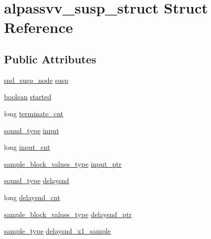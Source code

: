 \hypertarget{structalpassvv__susp__struct}{}\section{alpassvv\+\_\+susp\+\_\+struct Struct Reference}
\label{structalpassvv__susp__struct}
\subsection*{Public Attributes}
\begin{DoxyCompactItemize}
\item 
\hyperlink{sound_8h_a6b268203688a934bd798ceb55f85d4c0}{snd\+\_\+susp\+\_\+node} \hyperlink{structalpassvv__susp__struct_a9f18281901c2261d76bb10a85736bce1}{susp}
\item 
\hyperlink{cext_8h_a7670a4e8a07d9ebb00411948b0bbf86d}{boolean} \hyperlink{structalpassvv__susp__struct_a42d25934c0b3fc6941bc10245a004f41}{started}
\item 
long \hyperlink{structalpassvv__susp__struct_a7e84ba094ea388783220d8f06bdaadb2}{terminate\+\_\+cnt}
\item 
\hyperlink{sound_8h_a792cec4ed9d6d636d342d9365ba265ea}{sound\+\_\+type} \hyperlink{structalpassvv__susp__struct_a1400c2cdacdb5f4290a45a4e6f0c5e02}{input}
\item 
long \hyperlink{structalpassvv__susp__struct_a2bf32795545ad4ce2435f53834986b54}{input\+\_\+cnt}
\item 
\hyperlink{sound_8h_a83d17f7b465d1591f27cd28fc5eb8a03}{sample\+\_\+block\+\_\+values\+\_\+type} \hyperlink{structalpassvv__susp__struct_a546fa8aa6b2c88f7f592f653ef28b69e}{input\+\_\+ptr}
\item 
\hyperlink{sound_8h_a792cec4ed9d6d636d342d9365ba265ea}{sound\+\_\+type} \hyperlink{structalpassvv__susp__struct_a79c5e3cbb77d1af8748ded77f24116a0}{delaysnd}
\item 
long \hyperlink{structalpassvv__susp__struct_afa627499b9a93c716f54bd75216995a5}{delaysnd\+\_\+cnt}
\item 
\hyperlink{sound_8h_a83d17f7b465d1591f27cd28fc5eb8a03}{sample\+\_\+block\+\_\+values\+\_\+type} \hyperlink{structalpassvv__susp__struct_a7a5fe820692cbd90d42955a5d1636380}{delaysnd\+\_\+ptr}
\item 
\hyperlink{sound_8h_a3a9d1d4a1c153390d2401a6e9f71b32c}{sample\+\_\+type} \hyperlink{structalpassvv__susp__struct_a27b3273dcbdf0f9a96759327588efdf9}{delaysnd\+\_\+x1\+\_\+sample}
\item 

\end{DoxyCompactItemize}
